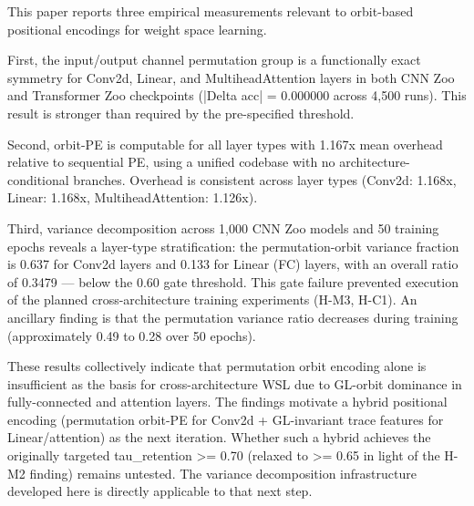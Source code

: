 
This paper reports three empirical measurements relevant to orbit-based positional encodings for weight space learning.

First, the input/output channel permutation group is a functionally exact symmetry for Conv2d, Linear, and MultiheadAttention layers in both CNN Zoo and Transformer Zoo checkpoints (|Delta acc| = 0.000000 across 4,500 runs). This result is stronger than required by the pre-specified threshold.

Second, orbit-PE is computable for all layer types with 1.167x mean overhead relative to sequential PE, using a unified codebase with no architecture-conditional branches. Overhead is consistent across layer types (Conv2d: 1.168x, Linear: 1.168x, MultiheadAttention: 1.126x).

Third, variance decomposition across 1,000 CNN Zoo models and 50 training epochs reveals a layer-type stratification: the permutation-orbit variance fraction is 0.637 for Conv2d layers and 0.133 for Linear (FC) layers, with an overall ratio of 0.3479 — below the 0.60 gate threshold. This gate failure prevented execution of the planned cross-architecture training experiments (H-M3, H-C1). An ancillary finding is that the permutation variance ratio decreases during training (approximately 0.49 to 0.28 over 50 epochs).

These results collectively indicate that permutation orbit encoding alone is insufficient as the basis for cross-architecture WSL due to GL-orbit dominance in fully-connected and attention layers. The findings motivate a hybrid positional encoding (permutation orbit-PE for Conv2d + GL-invariant trace features for Linear/attention) as the next iteration. Whether such a hybrid achieves the originally targeted tau_retention >= 0.70 (relaxed to >= 0.65 in light of the H-M2 finding) remains untested. The variance decomposition infrastructure developed here is directly applicable to that next step.

